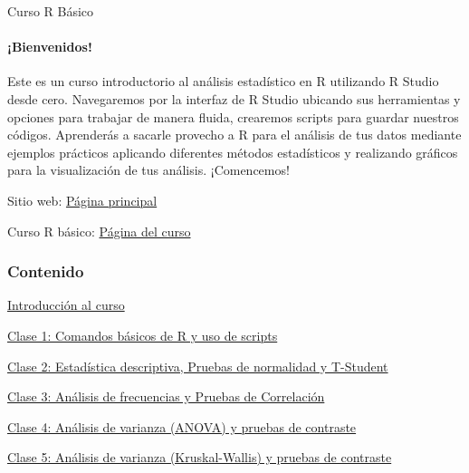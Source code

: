 \documentclass[
]{article}
\author{}
\date{\vspace{-2.5em}}
\begin{document}
Curso R Básico

\hypertarget{bienvenidos}{%
\paragraph{¡Bienvenidos!}\label{bienvenidos}}

Este es un curso introductorio al análisis estadístico en R utilizando R
Studio desde cero. Navegaremos por la interfaz de R Studio ubicando sus
herramientas y opciones para trabajar de manera fluida, crearemos
scripts para guardar nuestros códigos. Aprenderás a sacarle provecho a R
para el análisis de tus datos mediante ejemplos prácticos aplicando
diferentes métodos estadísticos y realizando gráficos para la
visualización de tus análisis. ¡Comencemos!

Sitio web: \href{https://www.hnbiology.org/}{Página principal}

Curso R básico: \href{https://www.hnbiology.org/}{Página del curso}

\hypertarget{contenido}{%
\subsubsection{Contenido}\label{contenido}}

\href{}{Introducción al curso}

\href{}{Clase 1: Comandos básicos de R y uso de scripts}

\href{}{Clase 2: Estadística descriptiva, Pruebas de normalidad y
T-Student}

\href{}{Clase 3: Análisis de frecuencias y Pruebas de Correlación}

\href{}{Clase 4: Análisis de varianza (ANOVA) y pruebas de contraste}

\href{}{Clase 5: Análisis de varianza (Kruskal-Wallis) y pruebas de
contraste}
\end{document}
